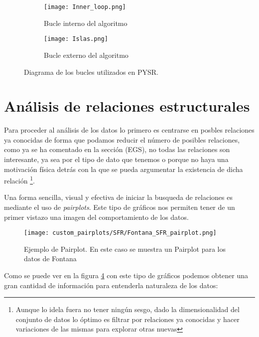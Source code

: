 \documentclass[11pt, a4paper]{article} %
\begin{document}
\begin{figure}[H]
    \centering
    \begin{subfigure}[b]{0.45\textwidth}
        \texttt{[image: Inner\_loop.png]}
        \caption{Bucle interno del algoritmo }
        \label{fig:sub11}
    \end{subfigure}
    \hfill
    \begin{subfigure}[b]{0.45\textwidth}
        \texttt{[image: Islas.png]}
        \caption{Bucle externo del algoritmo}
        \label{fig:sub22}
    \end{subfigure}
    \caption{Diagrama de los bucles utilizados en PYSR. \autocite{cranmerInterpretableMachineLearning2023}}
    \label{fig:imagenes_lado_a_ladoo}
\end{figure}
\section{Análisis de relaciones estructurales}

Para proceder al análisis de los datos lo primero es centrarse en posbles relaciones ya conocidas de forma que podamos reducir el número de posibles relaciones, como ya se ha comentado 
en la sección (EGS), no todas las relaciones son interesante, ya sea por el tipo de dato que tenemos o porque no haya una motivación física detrás con la que se pueda argumentar la existencia de dicha relación
\footnote{Aunque lo idela fuera no tener ningún sesgo, dado la dimensionalidad del conjunto de datos lo óptimo es filtrar por relaciones ya conocidas y hacer variaciones de las mismas para explorar otras nuevas}.

Una forma sencilla, visual y efectiva de iniciar la busqueda de relaciones es mediante el uso de \textit{pairplots}. Este tipo de gráficos nos permiten tener de un primer vistazo una imagen del comportamiento de los datos. 

\begin{figure}[H]
    \centering
    \texttt{[image: custom\_pairplots/SFR/Fontana\_SFR\_pairplot.png]}
    \caption{Ejemplo de Pairplot. En este caso se muestra un Pairplot para los datos de Fontana}
    \label{fig:pair_ex}
\end{figure}

Como se puede ver en la figura \ref{fig:pair_ex} con este tipo de gráficos podemos obtener una gran cantidad de información para entenderla naturaleza de los datos:
\end{document}
